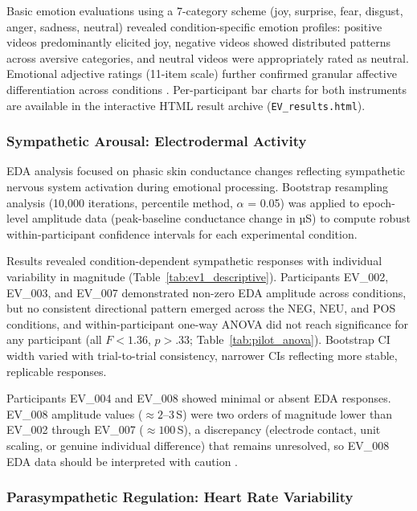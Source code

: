Basic emotion evaluations using a 7-category scheme (joy, surprise, fear, disgust, anger, sadness, neutral) revealed condition-specific emotion profiles: positive videos predominantly elicited joy, negative videos showed distributed patterns across aversive categories, and neutral videos were appropriately rated as neutral. Emotional adjective ratings (11-item scale) further confirmed granular affective differentiation across conditions \parencite{maffeiEMOVIEExperimentalMOVies2019}. Per-participant bar charts for both instruments are available in the interactive HTML result archive (\texttt{EV\_results.html}).

\subsubsection{Sympathetic Arousal: Electrodermal Activity}

\gls{EDA} analysis focused on phasic skin conductance changes reflecting sympathetic nervous system activation during emotional processing. Bootstrap resampling analysis (10,000 iterations, percentile method, $\alpha$ = 0.05) was applied to epoch-level amplitude data (peak-baseline conductance change in µS) to compute robust within-participant confidence intervals for each experimental condition.

Results revealed condition-dependent sympathetic responses with individual variability in magnitude (Table~\ref{tab:ev1_descriptive}). Participants EV\_002, EV\_003, and EV\_007 demonstrated non-zero \gls{EDA} amplitude across conditions, but no consistent directional pattern emerged across the NEG, NEU, and POS conditions, and within-participant one-way \gls{ANOVA} did not reach significance for any participant (all $F < 1.36$, $p > .33$; Table~\ref{tab:pilot_anova}). Bootstrap CI width varied with trial-to-trial consistency, narrower CIs reflecting more stable, replicable responses.

Participants EV\_004 and EV\_008 showed minimal or absent \gls{EDA} responses. EV\_008 amplitude values ($\approx 2$--3\,\textmu S) were two orders of magnitude lower than EV\_002 through EV\_007 ($\approx 100$\,\textmu S), a discrepancy (electrode contact, unit scaling, or genuine individual difference) that remains unresolved, so EV\_008 \gls{EDA} data should be interpreted with caution \parencite{boucseinElectrodermalActivity2012}.

\subsubsection{Parasympathetic Regulation: Heart Rate Variability}


